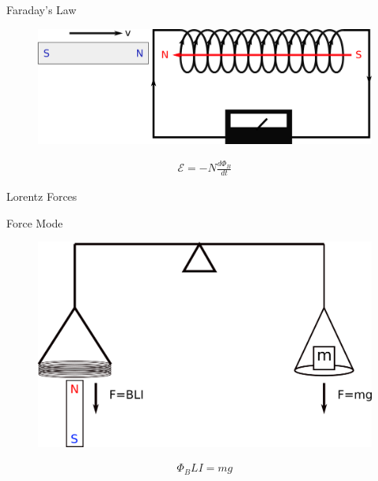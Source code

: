 \documentclass[12pt]{beamer}
\begin{document}

\begin{frame}{Faraday's Law}
    \begin{figure}
        \centering
        \includegraphics[width=0.8\linewidth]{figs/faraday.png}
        \label{fig:faraday}
    \end{figure}
    
    \pause
    \begin{align*}
    \mathcal{E}= -N\frac{d\Phi_B}{dt}
    \end{align*}

\end{frame}

\begin{frame}{Lorentz Forces}
\end{frame}

\begin{frame}{Force Mode}
    \begin{figure}
        \centering
        \includegraphics[width=0.6\linewidth]{figs/watt-balance-concept.png}
    \end{figure}
    
    \begin{align*}
        \Phi_B LI=mg
    \end{align*}
    
\end{frame}
\end{document}
